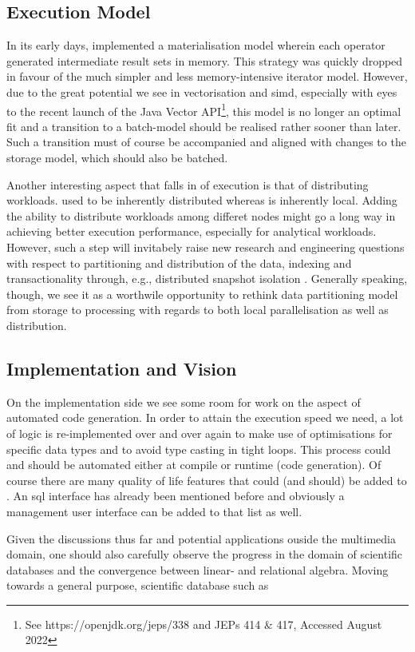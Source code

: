 \subsection{Execution Model}
In its early days, \cottontail{} implemented a materialisation model wherein each operator generated intermediate result sets in memory. This strategy was quickly dropped in favour of the much simpler and less memory-intensive iterator model. However, due to the great potential we see in vectorisation and \acrshort{simd}, especially with eyes to the recent launch of the Java Vector API\footnote{See https://openjdk.org/jeps/338 and JEPs 414 \& 417, Accessed August 2022}, this model is no longer an optimal fit and a transition to a batch-model should be realised rather sooner than later. Such a transition must of course be accompanied and aligned with changes to the storage model, which should also be batched.

Another interesting aspect that falls in of execution is that of distributing workloads. \adampro{} used to be inherently distributed \cite{Giangreco:2016Adam,Giangreco:2018Database} whereas \cottontail{} is inherently local. Adding the ability to distribute workloads among differet nodes might go a long way in achieving better execution performance, especially for analytical workloads. However, such a step will invitabely raise new research and engineering questions with respect to partitioning and distribution of the data, indexing and transactionality through, e.g., distributed snapshot isolation \cite{Binnig:2014Distributed}. Generally speaking, though, we see it as a worthwile opportunity to rethink \cottontail{} data partitioning model from storage to processing with regards to both local parallelisation as well as distribution.

\subsection{Implementation and Vision}
On the implementation side we see some room for work on the aspect of automated code generation. In order to attain the execution speed we need, a lot of logic is re-implemented over and over again to make use of optimisations for specific data types and to avoid type casting in tight loops. This process could and should be automated either at compile or runtime (code generation). Of course there are many quality of life features that could (and should) be added to \cottontail{}. An \acrshort{sql} interface has already been mentioned before and obviously a management user interface can be added to that list as well.

Given the discussions thus far and potential applications ouside the multimedia domain, one should also carefully observe the progress in the domain of scientific databases and the convergence between linear- and relational algebra. Moving towards a general purpose, scientific database such as \cite{Stonebraker:2013SciDB}